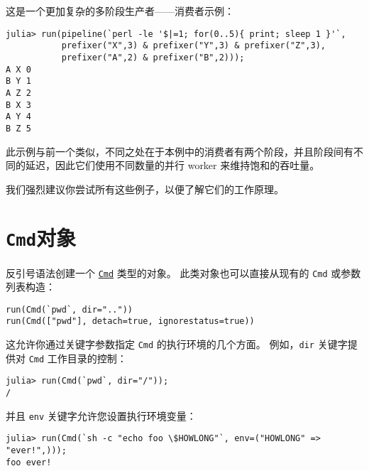 这是一个更加复杂的多阶段生产者——消费者示例：




\begin{verbatim}
julia> run(pipeline(`perl -le '$|=1; for(0..5){ print; sleep 1 }'`,
           prefixer("X",3) & prefixer("Y",3) & prefixer("Z",3),
           prefixer("A",2) & prefixer("B",2)));
A X 0
B Y 1
A Z 2
B X 3
A Y 4
B Z 5
\end{verbatim}



此示例与前一个类似，不同之处在于本例中的消费者有两个阶段，并且阶段间有不同的延迟，因此它们使用不同数量的并行 worker 来维持饱和的吞吐量。



我们强烈建议你尝试所有这些例子，以便了解它们的工作原理。



\hypertarget{4648668513566277987}{}


\section{\texttt{Cmd}对象}



反引号语法创建一个 \hyperlink{10541952265148699805}{\texttt{Cmd}} 类型的对象。 此类对象也可以直接从现有的 \texttt{Cmd} 或参数列表构造：




\begin{verbatim}
run(Cmd(`pwd`, dir=".."))
run(Cmd(["pwd"], detach=true, ignorestatus=true))
\end{verbatim}



这允许你通过关键字参数指定 \texttt{Cmd} 的执行环境的几个方面。 例如，\texttt{dir} 关键字提供对 \texttt{Cmd} 工作目录的控制：




\begin{verbatim}
julia> run(Cmd(`pwd`, dir="/"));
/
\end{verbatim}



并且 \texttt{env} 关键字允许您设置执行环境变量：




\begin{verbatim}
julia> run(Cmd(`sh -c "echo foo \$HOWLONG"`, env=("HOWLONG" => "ever!",)));
foo ever!
\end{verbatim}



